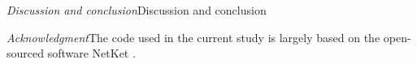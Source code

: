 \documentclass[aps,prl,reprint,superscriptaddress]{revtex4-2}
\begin{document}
\emph{Discussion and conclusion}\textemdash Discussion and conclusion

\emph{Acknowledgment}\textemdash The code used in the current study is largely based on the open-sourced software NetKet \cite{Carleo2019netket}.


%



%
\end{document}
